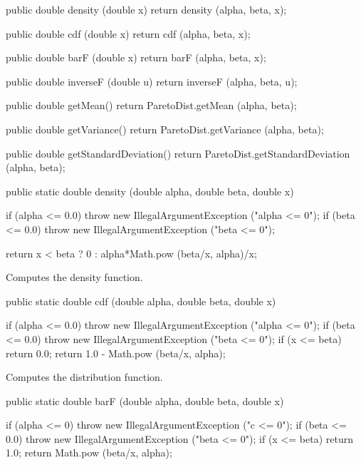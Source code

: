 \begin{code}\begin{hide}

   public double density (double x) {
      return density (alpha, beta, x);
   }

   public double cdf (double x) {
      return cdf (alpha, beta, x);
   }

   public double barF (double x) {
      return barF (alpha, beta, x);
   }

   public double inverseF (double u) {
      return inverseF (alpha, beta, u);
   }

   public double getMean() {
      return ParetoDist.getMean (alpha, beta);
   }

   public double getVariance() {
      return ParetoDist.getVariance (alpha, beta);
   }

   public double getStandardDeviation() {
      return ParetoDist.getStandardDeviation (alpha, beta);
   }\end{hide}

   public static double density (double alpha, double beta, double x)\begin{hide} {
      if (alpha <= 0.0)
        throw new IllegalArgumentException ("alpha <= 0");
      if (beta <= 0.0)
        throw new IllegalArgumentException ("beta <= 0");

      return x < beta ? 0 : alpha*Math.pow (beta/x, alpha)/x;
   }\end{hide}
\end{code}
\begin{tabb} Computes the density function.
\end{tabb}
\begin{code}

   public static double cdf (double alpha, double beta, double x)\begin{hide} {
      if (alpha <= 0.0)
        throw new IllegalArgumentException ("alpha <= 0");
      if (beta <= 0.0)
        throw new IllegalArgumentException ("beta <= 0");
      if (x <= beta)
         return 0.0;
      return 1.0 - Math.pow (beta/x, alpha);
   }\end{hide}
\end{code}
 \begin{tabb}
  Computes the distribution function.
 \end{tabb}
\begin{code}

   public static double barF (double alpha, double beta, double x)\begin{hide} {
      if (alpha <= 0)
        throw new IllegalArgumentException ("c <= 0");
      if (beta <= 0.0)
        throw new IllegalArgumentException ("beta <= 0");
      if (x <= beta)
         return 1.0;
      return Math.pow (beta/x, alpha);
   }\end{hide}
\end{code}
